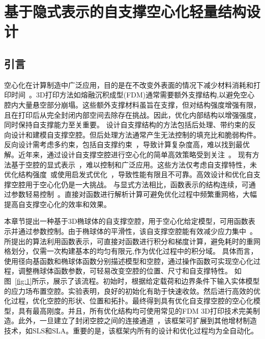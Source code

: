 
\chapter{基于隐式表示的自支撑空心化轻量结构设计}

\section{引言}
空心化在计算制造中广泛应用，目的是在不改变外表面的情况下减少材料消耗和打印时间~\cite{plocher2019review}。3D打印方法如熔融沉积成型(FDM)通常需要额外支撑结构,以避免空心腔内大量悬空部分崩塌。这些额外支撑材料虽旨在支撑，但对结构强度增强有限，且在打印后从完全封闭内部空间去除存在挑战。因此，优化内部结构以增强强度，同时保持自支撑能力至关重要。
设计自支撑结构的方法包括后处理、带约束的反向设计和建模自支撑空腔。但后处理方法通常产生无法控制的填充比和脆弱构件。反向设计需考虑多约束，包括自支撑约束~\cite{zheng2023topology}，导致计算复杂度高，难以找到最优解。近年来，通过设计自支撑空腔进行空心化的简单高效策略受到关注~\cite{lee2018support, wu2016self, wang2018support, xu2021support,liu2023self}。
现有方法基于空腔的显式表示~\cite{lee2018support, wu2016self}，难以控制和广泛应用。这些方法仅考虑自支撑特性，未优化结构强度~\cite{lee2018support,xu2021support}或使用启发式优化~\cite{wang2018support}，导致性能有限且不可靠。高效设计和优化自支撑空腔用于空心化仍是一大挑战。
与显式方法相比，函数表示的结构连续，可通过参数轻易控制~\cite{carr2001reconstruction, hu2020efficient}。直接对函数进行解析计算可避免优化过程中频繁重网格，大幅提高自支撑空心化的效率和效果。

本章节提出一种基于3D椭球体的自支撑空腔，用于空心化给定模型，可用函数表示并通过参数控制。由于椭球体的平滑性，该自支撑空腔能有效减少应力集中~\cite{2008Peterson}。所提出的算法利用函数表示，可直接对函数进行积分和梯度计算，避免耗时的重网格划分，仅需一次构建基本的均匀有限元,作为优化过程中的积分域。
具体而言，使用径向基函数和椭球体函数分别描述模型和空腔，通过操作函数可实现空心化过程，调整椭球体函数参数，可轻易改变空腔的位置、尺寸和自支撑特性。
如图~\ref{fig:1}所示，展示了该流程。初始时，根据给定载荷和边界条件下输入实体模型的应力场布置空腔。实验表明，良好的初始化有助于快速收敛。然后进行高效的优化过程，优化空腔的形状、位置和拓扑。最终得到具有优化自支撑空腔的空心化模型，具有最高刚度。并且，所有优化结构均可使用常见的FDM 3D打印技术完美制造。此外，一旦建立了封闭空腔之间的连接通道~\cite{yang2023differentiable}，该框架可扩展到其他增材制造技术，如SLS和SLA。重要的是，该框架内所有的设计和优化过程均为全自动化。

